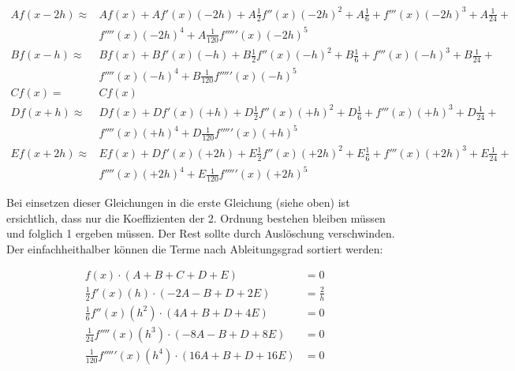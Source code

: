 \begin{equation}
	\begin{split}
Af(x-2h) \approx & Af(x) + Af'(x)(-2h) + A\frac{1}{2}f''(x)(-2h)^2+A\frac{1}{6} + f'''(x)(-2h)^3+A\frac{1}{24} + \\ 
	& f''''(x)(-2h)^4 + A\frac{1}{120}f'''''(x)(-2h)^5 \\
Bf(x-h) \approx & Bf(x) + Bf'(x)(-h) + B\frac{1}{2}f''(x)(-h)^2+B\frac{1}{6} + f'''(x)(-h)^3+B\frac{1}{24} + \\ 
& f''''(x)(-h)^4 + B\frac{1}{120}f'''''(x)(-h)^5 \\
Cf(x) = & Cf(x) \\
Df(x+h) \approx & Df(x) + Df'(x)(+h) + D\frac{1}{2}f''(x)(+h)^2+D\frac{1}{6} + f'''(x)(+h)^3+D\frac{1}{24} + \\ 
& f''''(x)(+h)^4 + D\frac{1}{120}f'''''(x)(+h)^5 \\
Ef(x+2h) \approx & Ef(x) + Df'(x)(+2h) + E\frac{1}{2}f''(x)(+2h)^2+E\frac{1}{6} + f'''(x)(+2h)^3+E\frac{1}{24} + \\ 
& f''''(x)(+2h)^4 + E\frac{1}{120}f'''''(x)(+2h)^5
	\end{split}
\end{equation}

Bei einsetzen dieser Gleichungen in die erste Gleichung (siehe oben) ist ersichtlich, dass nur die Koeffizienten der 2. Ordnung bestehen bleiben müssen und folglich 1 ergeben müssen. Der Rest sollte durch Auslöschung verschwinden. Der einfachheithalber können die Terme nach Ableitungsgrad sortiert werden:

\begin{equation}
\begin{split}
f(x) \cdot (A + B + C + D + E) & = 0 \\
\frac{1}{2} f'(x)(h) \cdot (-2A - B + D + 2E) &= \frac{2}{h}\\
\frac{1}{6} f''(x)(h^2) \cdot (4A + B + D + 4E) &= 0 \\
\frac{1}{24} f''''(x)(h^3) \cdot (-8A - B + D + 8E) &= 0 \\
\frac{1}{120} f'''''(x)(h^4) \cdot (16A + B + D + 16E) &= 0 
\end{split}
\end{equation}

